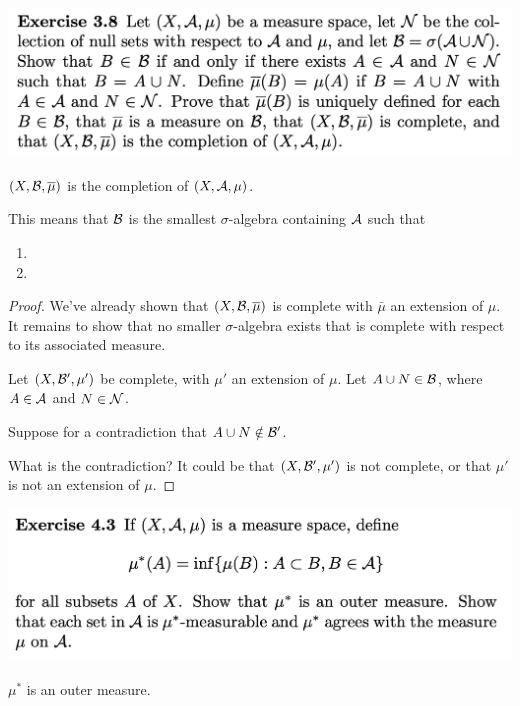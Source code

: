 \includegraphics[width=400pt]{img/analysis--berkeley-202a-hw04-c88b.png}
\begin{claim*}
  $(X, \mathcal B, \overline{\mu})$ is the completion of $(X, \mathcal A, \mu)$.

  This means that $\mathcal B$ is the smallest $\sigma$-algebra containing $\mathcal A$ such that
  \begin{enumerate}
  \item
  \item
  \end{enumerate}
\end{claim*}

\begin{proof}
  We've already shown that $(X, \mathcal B, \overline\mu)$ is complete with $\bar{\mu}$ an extension of $\mu$. It remains
  to show that no smaller $\sigma$-algebra exists that is complete with respect to its associated measure.

  Let $(X, \mathcal B', \mu')$ be complete, with $\mu'$ an extension of $\mu$. Let $A \cup N \in \mathcal B$,
  where $A \in \mathcal A$ and $N \in \mathcal N$.

  Suppose for a contradiction that $A \cup N \notin \mathcal B'$.

  What is the contradiction? It could be that $(X, \mathcal B', \mu')$ is not complete, or that $\mu'$ is not an
  extension of $\mu$.

\end{proof}

\newpage
\begin{mdframed}
  \includegraphics[width=400pt]{img/analysis--berkeley-202a-hw-0d98.png}
\end{mdframed}

\begin{claim*}
  $\mu^*$ is an outer measure.
\end{claim*}

